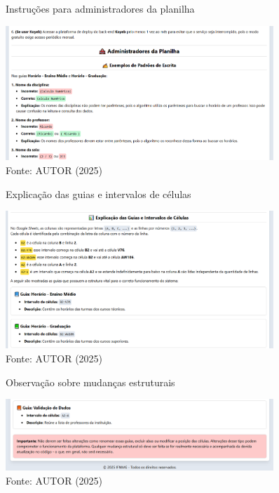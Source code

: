 \begin{figure}[htb]
    \centering
    \caption{Instruções para administradores da planilha}
    \includegraphics[width=0.9\textwidth]{Figuras/doc-2.png}
    \caption*{Fonte: AUTOR (2025)}
    \label{fig_doc_2}
\end{figure}

\begin{figure}[htb]
    \centering
    \caption{Explicação das guias e intervalos de células}
    \includegraphics[width=0.9\textwidth]{Figuras/doc-3.png}
    \caption*{Fonte: AUTOR (2025)}
    \label{fig_doc_3}
\end{figure}

\begin{figure}[htb]
    \centering
    \caption{Observação sobre mudanças estruturais}
    \includegraphics[width=0.9\textwidth]{Figuras/doc-4.png}
    \caption*{Fonte: AUTOR (2025)}
    \label{fig_doc_4}
\end{figure}
